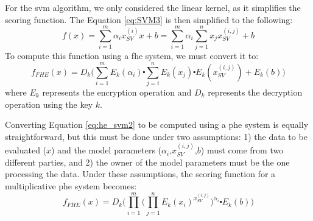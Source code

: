 For the \ac{svm} algorithm, we only considered the linear kernel, as it simplifies the scoring function. The Equation \ref{eq:SVM3} is then simplified to the following:
\begin{equation}
\label{eq:he_svm1}
f(x)=\sum_{i=1}^m \alpha_i x_{SV}^{(i)}x+b = \sum_{i=1}^m \alpha_i \sum_{j=1}^n x_j x_{SV}^{(i,j)} + b
\end{equation}
To compute this function using a \ac{fhe} system, we must convert it to:
\begin{equation}
\label{eq:he_svm2}
f_{FHE}(x) = D_k\Bigg( \sum_{i=1}^m E_k(\alpha_i) \centerdot \sum_{j=i}^n E_k(x_j) \centerdot E_k(x_{SV}^{(i,j)}) + E_k(b)\Bigg)
\end{equation}
where $E_k$ represents the encryption operation and $D_k$ represents the decryption operation using the key $k$.

Converting Equation \ref{eq:he_svm2} to be computed using a \ac{phe} system is equally straightforward, but this must be done under two assumptions: 1) the data to be evaluated ($x$) and the model parameters ($\alpha_i$,$x_{SV}^{(i,j)}$,$b$) must come from two different parties, and 2) the owner of the model parameters must be the one processing the data. Under these assumptions, the scoring function for a multiplicative \ac{phe} system becomes:
\begin{equation}
\label{eq:he_svm3}
f_{FHE}(x) = D_k\Bigg( \prod_{i=1}^m \bigg(\prod_{j=1}^n E_k(x_i)^{x_{SV}^{(i,j)}} \bigg)^{\alpha_i} \centerdot E_k(b) \Bigg)
\end{equation}